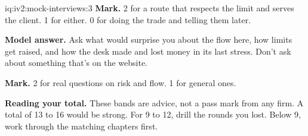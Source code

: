 \begin{solution}{iq:iv2:mock-interviews:3}
\textbf{Mark.} 2 for a route that respects the limit and serves the client. 1 for either. 0 for doing the trade and telling them later.

\ivstop
\textbf{Model answer.} Ask what would surprise you about the flow here, how limits get raised, and how the desk made and lost money in its last stress. Don't ask about something that's on the website.

\textbf{Mark.} 2 for real questions on risk and flow. 1 for general ones.

\medskip
\textbf{Reading your total.} These bands are advice, not a pass mark from any firm. A total of 13 to 16 would be strong. For 9 to 12, drill the rounds you lost. Below 9, work through the matching chapters first.

\end{solution}


